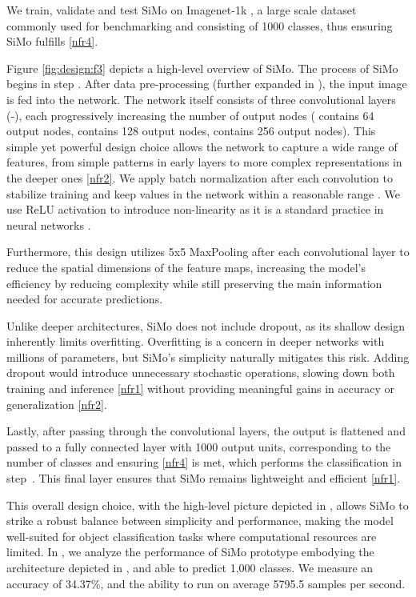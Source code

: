 We train, validate and test SiMo on Imagenet-1k \cite{DBLP:conf/cvpr/DengDSLL009}, a large scale dataset commonly used for benchmarking and consisting of 1000 classes, thus ensuring SiMo fulfills \ref{nfr4}.

Figure \ref{fig:design:f3} depicts a high-level overview of SiMo. The process of SiMo begins in step . After data pre-processing (further expanded in ), the input image is fed into the network. The network itself consists of three convolutional layers (-), each progressively increasing the number of output nodes ( contains 64 output nodes,  contains 128 output nodes,  contains 256 output nodes). This simple yet powerful design choice allows the network to capture a wide range of features, from simple patterns in early layers to more complex representations in the deeper ones \ref{nfr2}. We apply batch normalization after each convolution to stabilize training and keep values in the network within a reasonable range \cite{NEURIPS2018_905056c1}. We use ReLU activation to introduce non-linearity as it is a standard practice in neural networks \cite{rasamoelina2020review}. 

Furthermore, this design utilizes 5x5 MaxPooling after each convolutional layer to reduce the spatial dimensions of the feature maps, increasing the model's efficiency by reducing complexity while still preserving the main information needed for accurate predictions.

Unlike deeper architectures, SiMo does not include dropout, as its shallow design inherently limits overfitting. Overfitting is a concern in deeper networks with millions of parameters, but SiMo’s simplicity naturally mitigates this risk. Adding dropout would introduce unnecessary stochastic operations, slowing down both training and inference \ref{nfr1} without providing meaningful gains in accuracy or generalization \ref{nfr2}.

Lastly, after passing through the convolutional layers, the output is flattened and passed to a fully connected layer  with 1000 output units, corresponding to the number of classes and ensuring \ref{nfr4} is met, which performs the classification in step~. This final layer ensures that SiMo remains lightweight and efficient \ref{nfr1}. 

This overall design choice, with the high-level picture depicted in , allows SiMo to strike a robust balance between simplicity and performance, making the model well-suited for object classification tasks where computational resources are limited. In , we analyze the performance of SiMo prototype embodying the architecture depicted in , and able to predict 1,000 classes. We measure an accuracy of 34.37\%, and the ability to run on average 5795.5 samples per second.



